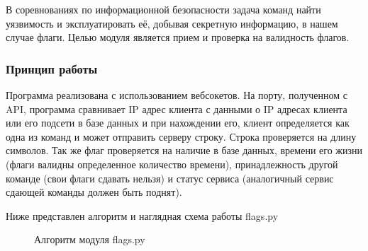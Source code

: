 В соревнованиях по информационной безопасности задача команд найти уязвимость и эксплуатировать её, добывая секретную информацию, в нашем случае флаги. Целью модуля является прием и проверка на валидность флагов.

\subsubsection{Принцип работы}

Программа реализована с использованием вебсокетов. На порту, полученном с API, программа сравнивает IP адрес клиента с данными о IP адресах клиента или его подсети в базе данных и при нахождении его, клиент определяется как одна из команд и может отправить серверу строку. Строка проверяется на длину символов. Так же флаг проверяется на наличие в базе данных, времени его жизни (флаги валидны определенное количество времени), принадлежность другой команде (свои флаги сдавать нельзя) и статус сервиса (аналогичный сервис сдающей команды должен быть поднят). 

Ниже представлен алгоритм и наглядная схема работы flags.py

\begin{figure}[ht!]
\caption{Алгоритм модуля flags.py}
\end{figure} 

